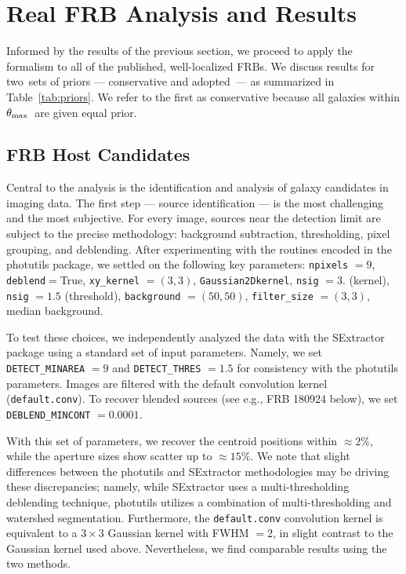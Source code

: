 \documentclass[twocolumn,linenumbers]{aastex63}
\newcommand{\mthmax}{\theta_{\rm max}}  %
\newcommand{\thmax}{$\mthmax$}
\newcommand{\nsets}{two}  %
\newcommand{\adopted}{adopted}
\begin{document}


\section{Real FRB Analysis and Results}
\label{sec:results}

Informed by the results of the previous section, we 
proceed to apply the formalism to all of the published,
well-localized FRBs.  We discuss 
results for \nsets~sets of priors --- conservative and 
\adopted\  --- as summarized in Table~\ref{tab:priors}.  
We refer to the first as conservative because 
all galaxies within \thmax\ are given equal prior. 



\subsection{FRB Host Candidates}

Central to the analysis is the identification and analysis
of galaxy candidates in imaging data.  The first
step --- source identification ---
is the most challenging and the most subjective.
For every image, sources near the detection limit are
subject to the precise methodology: 
background subtraction, thresholding, pixel grouping, and deblending.
After experimenting with the routines encoded in the
{\sc photutils} package, we settled on the following key parameters: \texttt{npixels} $=9$, \texttt{deblend}$=$True, \texttt{xy\_kernel} $=(3,3)$,
\texttt{Gaussian2Dkernel}, \texttt{nsig} $=3.$ (kernel),  \texttt{nsig} $=1.5$ (threshold),
\texttt{background} $=(50,50)$, \texttt{filter\_size} $=(3,3)$, median background.

To test these choices, we independently analyzed the
data with the SExtractor package using a standard set
of input parameters. Namely, we set {\texttt {DETECT\_MINAREA}} $= 9$ and {\texttt {DETECT\_THRES}} $= 1.5$ for consistency with the {\sc photutils} parameters. Images are filtered with the default convolution kernel (\texttt{default.conv}). To recover blended sources (see e.g., FRB 180924 below), we set {\texttt {DEBLEND\_MINCONT}} $= 0.0001$.

With this set of parameters, we recover the centroid positions within $\approx 2\%$, while the aperture sizes show scatter up to $\approx 15\%$. We note that slight differences between the {\sc photutils} and SExtractor methodologies may be driving these discrepancies; namely, while SExtractor uses a multi-thresholding deblending technique, {\sc photutils} utilizes a combination of multi-thresholding and watershed segmentation. Furthermore, the \texttt{default.conv} convolution kernel is equivalent to a $3\times3$ Gaussian kernel with FWHM $ = 2$, in slight contrast to the Gaussian kernel used above. Nevertheless, we find comparable results using the two methods.
\end{document}
